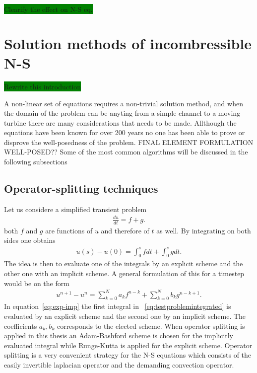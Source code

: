 \colorbox{green}{Clearify the effect on N-S eq.}

\section{Solution methods of incombressible N-S}
\colorbox{green}{Rewrite this introduction}


A non-linear set of equations requires a non-trivial solution method, and when the domain of the problem can be anyting from a simple channel 
to a moving turbine there are many considerations that needs to be made. Allthough the equations have been known for over 200 years no one 
has been able to prove or disprove the well-posedness of the problem. FINAL ELEMENT FORMULATION WELL-POSED?? Some of the most common algorithms 
will be discussed in the following subsections

\subsection{Operator-splitting techniques }
Let us considere a simplified transient problem 
\begin{align}
    \frac{du}{dt} = f + g.
    \label{eq:testproblem}
\end{align}
both $f$ and $g$ are functions of $u$ and therefore of $t$ as well. By integrating on both sides one obtains
\begin{align}
    u(s) - u(0) = \int_0^s f dt + \int_0^s g dt.
    \label{eq:testproblemintegrated}
\end{align}
The idea is then to evaluate one of the integrals by an explicit scheme and the other one with an implicit scheme.
A general formulation of this for a timestep would be on the form 
\begin{align}
    u^{n+1}-u^{n} = \sum_{k = 0}^{N} a_k f^{n-k}+\sum_{k = 0}^{N} b_k g^{n-k+1}.
    \label{eq:exp-imp}
\end{align}
In equation~\ref{eq:exp-imp} the first integral in ~\ref{eq:testproblemintegrated} is evaluated by 
an explicit scheme and the second one by an implicit scheme. The coefficients $a_k,b_k$ corresponds to 
the elected scheme. When operator splitting is applied in this thesis an Adam-Bashford scheme is 
chosen for the implicitly evaluated integral while Runge-Kutta is applied for the explicit scheme. 
Operator splitting is a very convenient strategy for 
the N-S equations which consists of the easily invertible laplacian operator 
and the demanding convection operator. 

